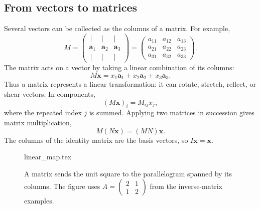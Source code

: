 \subsection{From vectors to matrices}
Several vectors can be collected as the columns of a matrix. For example,
\begin{equation}
    M=\begin{pmatrix}\,|&|&|\\
    \mathbf{a}_1&\mathbf{a}_2&\mathbf{a}_3\\
    \,|&|&|
    \end{pmatrix}
    =\begin{pmatrix}
    a_{11}&a_{12}&a_{13}\\
    a_{21}&a_{22}&a_{23}\\
    a_{31}&a_{32}&a_{33}
    \end{pmatrix}.
\end{equation}
The matrix acts on a vector by taking a linear combination of its columns:
\begin{equation}
    M\mathbf{x}
    =x_1\mathbf{a}_1+x_2\mathbf{a}_2+x_3\mathbf{a}_3.
\end{equation}
Thus a matrix represents a linear transformation: it can rotate, stretch, reflect, or shear vectors. In components,
\begin{equation}
    (M\mathbf{x})_i=M_{ij}x_j,
\end{equation}
where the repeated index $j$ is summed. Applying two matrices in succession gives matrix multiplication,
\begin{equation}
    M(N\mathbf{x})=(MN)\mathbf{x}.
\end{equation}
The columns of the identity matrix are the basis vectors, so $I\mathbf{x}=\mathbf{x}$.

\begin{figure}[H]
    \centering
    {linear_map.tex}
    \caption{A matrix sends the unit square to the parallelogram spanned by its columns. The figure uses $A=\begin{pmatrix}2&1\\1&2\end{pmatrix}$ from the inverse-matrix examples.}
    \label{fig:vec-linear-map}
\end{figure}
